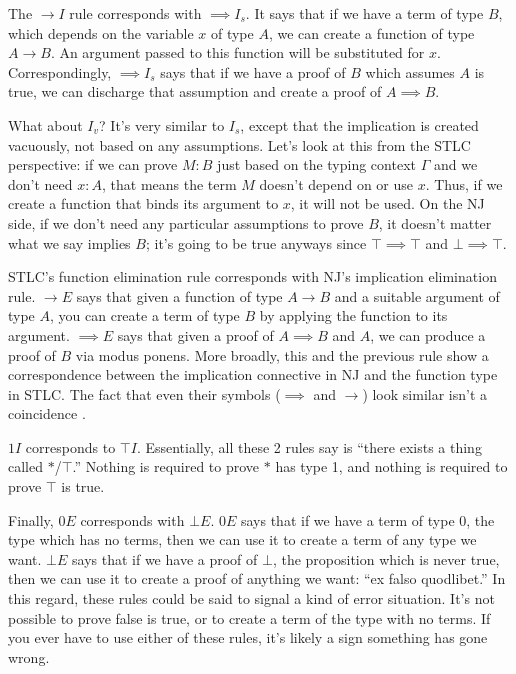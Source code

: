 \documentclass[12pt]{article}
\begin{document}
The $\to I$ rule corresponds with $\implies I_s$. It says that if we have a term of type $B$, which depends on the variable $x$ of type $A$, we can create a function of type $A \to B$. An argument passed to this function will be substituted for $x$. Correspondingly, $\implies I_s$ says that if we have a proof of $B$ which assumes $A$ is true, we can discharge that assumption and create a proof of $A \implies B$.

What about $I_v$? It's very similar to $I_s$, except that the implication is created vacuously, not based on any assumptions. Let's look at this from the STLC perspective: if we can prove $M: B$ just based on the typing context $\Gamma$ and we don't need $x: A$, that means the term $M$ doesn't depend on or use $x$. Thus, if we create a function that binds its argument to $x$, it will not be used. On the NJ side, if we don't need any particular assumptions to prove $B$, it doesn't matter what we say implies $B$; it's going to be true anyways since $\top \implies \top$ and $\bot \implies \top$.

STLC's function elimination rule corresponds with NJ's implication elimination rule. $\to E$ says that given a function of type $A \to B$ and a suitable argument of type $A$, you can create a term of type $B$ by applying the function to its argument. $\implies E$ says that given a proof of $A \implies B$ and $A$, we can produce a proof of $B$ via modus ponens. More broadly, this and the previous rule show a correspondence between the implication connective in NJ and the function type in STLC. The fact that even their symbols ($\implies$ and $\to$) look similar isn't a coincidence \cite{howard}.

$1I$ corresponds to $\top I$. Essentially, all these 2 rules say is ``there exists a thing called $*$/$\top$.'' Nothing is required to prove $*$ has type 1, and nothing is required to prove $\top$ is true.

Finally, $0E$ corresponds with $\bot E$. $0E$ says that if we have a term of type 0, the type which has no terms, then we can use it to create a term of any type we want. $\bot E$ says that if we have a proof of $\bot$, the proposition which is never true, then we can use it to create a proof of anything we want: ``ex falso quodlibet.'' In this regard, these rules could be said to signal a kind of error situation. It's not possible to prove false is true, or to create a term of the type with no terms. If you ever have to use either of these rules, it's likely a sign something has gone wrong.
\end{document}
